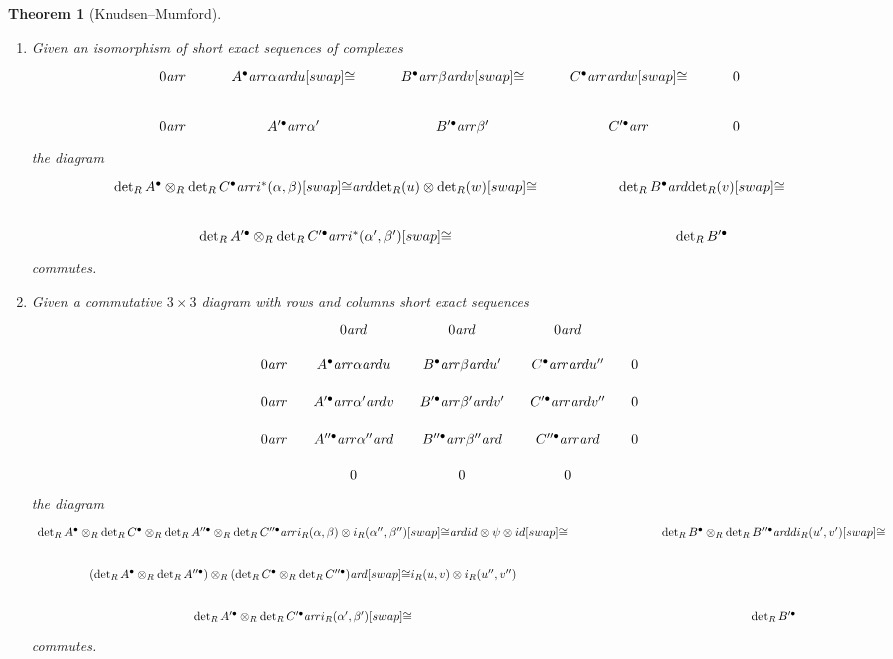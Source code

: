 \documentclass[10pt,a4paper,oneside,draft]{article}
\renewcommand{\det}{\operatorname{det}}
\newcommand{\ar}{\text{\it ar}}
\theoremstyle{myplain}
\newtheorem{theorem}{Theorem}[section]
\theoremstyle{mydefinition}
\numberwithin{equation}{section}
\begin{document}
\begin{appendices}
\begin{theorem}[Knudsen--Mumford]
  \begin{enumerate}
  \item[i)] Given an isomorphism of short exact sequences of complexes
    \[ \begin{tikzcd}
        0 \ar{r} & A^\bullet \ar{r}{\alpha}\ar{d}{u}[swap]{\cong} & B^\bullet \ar{r}{\beta}\ar{d}{v}[swap]{\cong} & C^\bullet \ar{r}\ar{d}{w}[swap]{\cong} & 0 \\
        0 \ar{r} & A'^\bullet \ar{r}{\alpha'} & B'^\bullet \ar{r}{\beta'} & C'^\bullet \ar{r} & 0
      \end{tikzcd} \]
    the diagram
    \[ \begin{tikzcd}[column sep=5em]
        \det_R A^\bullet \otimes_R \det_R C^\bullet \ar{r}{i^* (\alpha,\beta)}[swap]{\cong}\ar{d}{\det_R (u) \otimes \det_R (w)}[swap]{\cong} & \det_R B^\bullet\ar{d}{\det_R (v)}[swap]{\cong} \\
        \det_R A'^\bullet \otimes_R \det_R C'^\bullet \ar{r}{i^* (\alpha',\beta')}[swap]{\cong} & \det_R B'^\bullet
      \end{tikzcd} \]
    commutes.

  \item[ii)] Given a commutative $3\times 3$ diagram with rows and columns short
    exact sequences
    \[ \begin{tikzcd}[row sep=1em, column sep=1em]
        & 0\ar{d} & 0\ar{d} & 0\ar{d} \\
        0\ar{r} & A^\bullet\ar{r}{\alpha}\ar{d}{u} & B^\bullet\ar{r}{\beta}\ar{d}{u'} & C^\bullet\ar{r}\ar{d}{u''} & 0 \\
        0\ar{r} & A'^\bullet\ar{r}{\alpha'}\ar{d}{v} & B'^\bullet\ar{r}{\beta'}\ar{d}{v'} & C'^\bullet\ar{r}\ar{d}{v''} & 0 \\
        0\ar{r} & A''^\bullet\ar{r}{\alpha''}\ar{d} & B''^\bullet\ar{r}{\beta''}\ar{d} & C''^\bullet\ar{r}\ar{d} & 0 \\
        & 0 & 0 & 0
      \end{tikzcd} \]
    the diagram
    \[ \begin{tikzcd}[column sep=7em]
        \det_R A^\bullet \otimes_R \det_R C^\bullet \otimes_R \det_R A''^\bullet \otimes_R \det_R C''^\bullet \ar{r}{i_R (\alpha,\beta) \otimes i_R (\alpha'',\beta'')}[swap]{\cong}\ar{d}{id \otimes \psi \otimes id}[swap]{\cong} & \det_R B^\bullet \otimes_R \det_R B''^\bullet\ar{dd}{i_R (u',v')}[swap]{\cong} \\
        (\det_R A^\bullet \otimes_R \det_R A''^\bullet) \otimes_R (\det_R C^\bullet \otimes_R \det_R C''^\bullet)\ar{d}[swap]{\cong}{i_R (u,v) \otimes i_R (u'',v'')} \\
        \det_R A'^\bullet \otimes_R \det_R C'^\bullet \ar{r}{i_R (\alpha',\beta')}[swap]{\cong} & \det_R B'^\bullet
      \end{tikzcd} \]
    commutes.


\end{enumerate}
\end{theorem}
\end{appendices}
\end{document}
